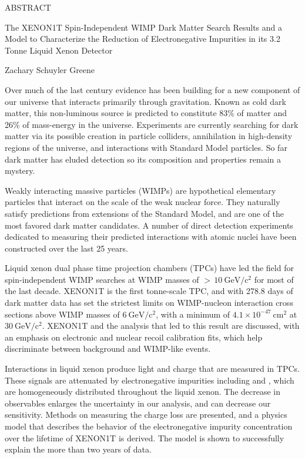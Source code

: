 
\pagestyle{empty} %
\begin{center}
  ABSTRACT

The XENON1T Spin-Independent WIMP Dark Matter Search Results and a Model to Characterize the Reduction of Electronegative Impurities in
its 3.2 Tonne Liquid Xenon Detector

Zachary Schuyler Greene
\end{center}

Over much of the last century evidence has been building for a new component of our universe that interacts primarily through
gravitation.  Known as cold dark matter, this non-luminous source is predicted to constitute 83\% of matter and 26\% of mass-energy in the
universe.  Experiments are currently searching for dark matter via its possible creation in particle colliders, annihilation in
high-density regions of the universe, and interactions with Standard Model particles.  So far dark matter has eluded detection so its
composition and properties remain a mystery.

Weakly interacting massive particles (WIMPs) are hypothetical elementary particles that interact on the scale of the weak nuclear
force.  They naturally satisfy predictions from extensions of the Standard Model, and are one of the most favored dark matter
candidates.  A number of direct detection experiments dedicated to measuring their predicted interactions with atomic nuclei have been
constructed over the last 25 years.

Liquid xenon dual phase time projection chambers (TPCs) have led the field for spin-independent WIMP searches at WIMP masses of
${>}\, 10\ \mathrm{GeV/c^2}$ for most of the last decade.  XENON1T is the first tonne-scale TPC, and with 278.8 days of dark matter data
has set the strictest limits on WIMP-nucleon interaction cross sections above WIMP masses of $6\ \mathrm{GeV/c^2}$, with a minimum of
$4.1 \times 10^{-47}\ \mathrm{cm^2}$ at $30\ \mathrm{GeV/c^2}$.  XENON1T and the analysis that led to this
result are discussed, with an emphasis on electronic and nuclear recoil calibration fits, which help discriminate between background and
WIMP-like events.

Interactions in liquid xenon produce light and charge that are measured in TPCs.  These signals are attenuated by electronegative
impurities including  and , which are homogeneously distributed throughout the liquid xenon.  The decrease in observables
enlarges the uncertainty in our analysis, and can decrease our sensitivity.  Methods on measuring the
charge loss are presented, and a physics model that describes the behavior of the electronegative impurity concentration over the
lifetime of XENON1T is derived.  The model is shown to successfully explain the more than two years of data.